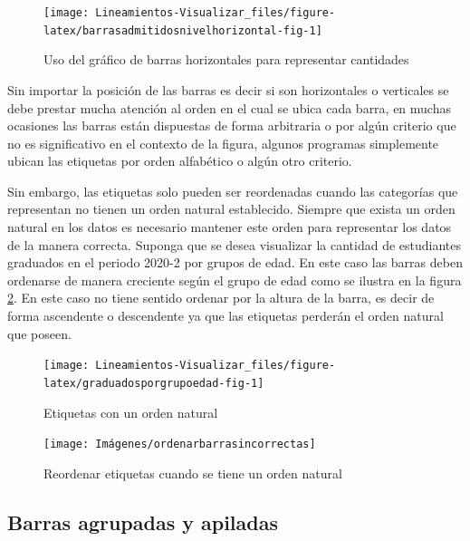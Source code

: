 \documentclass[
]{book}
\begin{document}
\begin{figure}

{\centering \texttt{[image: Lineamientos-Visualizar\_files/figure-latex/barrasadmitidosnivelhorizontal-fig-1]} 

}

\caption{Uso del gráfico de barras horizontales para representar cantidades}\label{fig:barrasadmitidosnivelhorizontal-fig}
\end{figure}

Sin importar la posición de las barras es decir si son horizontales o verticales se debe prestar mucha atención al orden en el cual se ubica cada barra, en muchas ocasiones las barras están dispuestas de forma arbitraria o por algún criterio que no es significativo en el contexto de la figura, algunos programas simplemente ubican las etiquetas por orden alfabético o algún otro criterio.

Sin embargo, las etiquetas solo pueden ser reordenadas cuando las categorías que representan no tienen un orden natural establecido. Siempre que exista un orden natural en los datos es necesario mantener este orden para representar los datos de la manera correcta. Suponga que se desea visualizar la cantidad de estudiantes graduados en el periodo 2020-2 por grupos de edad. En este caso las barras deben ordenarse de manera creciente según el grupo de edad como se ilustra en la figura \ref{fig:graduadosporgrupoedad-fig}. En este caso no tiene sentido ordenar por la altura de la barra, es decir de forma ascendente o descendente ya que las etiquetas perderán el orden natural que poseen.

\begin{figure}

{\centering \texttt{[image: Lineamientos-Visualizar\_files/figure-latex/graduadosporgrupoedad-fig-1]} 

}

\caption{Etiquetas con un orden natural}\label{fig:graduadosporgrupoedad-fig}
\end{figure}

\begin{figure}

{\centering \texttt{[image: Imágenes/ordenarbarrasincorrectas]} 

}

\caption{Reordenar etiquetas cuando se tiene un orden natural}\label{fig:partesgrafico2-fig}
\end{figure}

\hypertarget{barras-agrupadas-y-apiladas}{%
\subsection{Barras agrupadas y apiladas}\label{barras-agrupadas-y-apiladas}}
\end{document}

